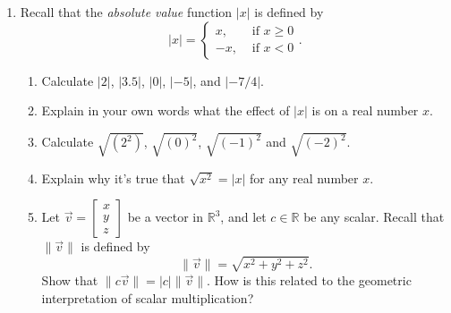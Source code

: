 \documentclass[12pt]{article}
\newcommand{\abs}[1]{\lvert #1\rvert}
\newcommand{\len}[1]{\lVert #1\rVert}
\newcommand{\R}{\mathbb{R}}
\begin{document}
\begin{enumerate}
\newpage

\item Recall that the {\em absolute value} function $\abs{x}$ is defined by
\[
 \abs{x} = \begin{cases} x, & \text{ if } x\geq 0\\ -x, & \text{ if } x<0\end{cases}.
\]
\begin{enumerate}
 \item Calculate $\abs{2}$, $\abs{3.5}$, $\abs{0}$, $\abs{-5}$, and $\abs{-7/4}$.

\vspace{1.5in}

 \item Explain in your own words what the effect of $\abs{x}$ is on a real number $x$.

\vspace{2in}

 \item Calculate $\sqrt{(2^2)}$, $\sqrt{(0)^2}$, $\sqrt{(-1)^2}$ and $\sqrt{(-2)^2}$. 

\vspace{1.5in}

 \item Explain why it's true that $\sqrt{x^2} = \abs{x}$ for any real number $x$.

\newpage

 \item Let $\vec{v} = \begin{bmatrix}x\\y\\z\end{bmatrix}$ be a vector in $\R^3$, and let $c\in \R$ be any scalar. Recall that $\len{\vec{v}}$ is defined by
\[
 \len{\vec{v}} = \sqrt{x^2+y^2+z^2}.
\]
Show that $\len{c\vec{v}} = \abs{c}\len{\vec{v}}$. How is this related to the geometric interpretation of scalar multiplication?
\end{enumerate}

 \end{enumerate}
\end{document}
